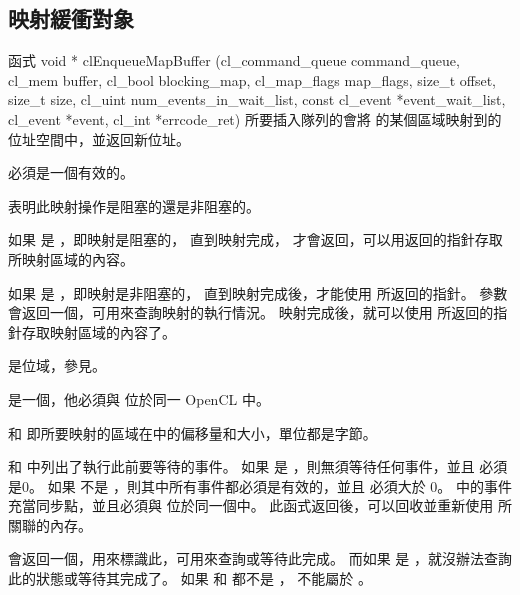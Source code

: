 \subsection{映射緩衝對象}

函式
\startCLFUNC
void * clEnqueueMapBuffer (cl_command_queue command_queue,
			cl_mem buffer,
			cl_bool blocking_map,
			cl_map_flags map_flags,
			size_t offset,
			size_t size,
			cl_uint num_events_in_wait_list,
			const cl_event *event_wait_list,
			cl_event *event,
			cl_int *errcode_ret)
\stopCLFUNC
所要插入隊列的會將  的某個區域映射到的位址空間中，並返回新位址。

 必須是一個有效的。

 表明此映射操作是{\ftRef 阻塞的}還是{\ftRef 非阻塞的}。

如果  是 ，即映射是阻塞的，
直到映射完成，  才會返回，可以用返回的指針存取所映射區域的內容。

如果  是 ，即映射是非阻塞的，
直到映射完成後，才能使用  所返回的指針。
參數  會返回一個，可用來查詢映射的執行情況。
映射完成後，就可以使用  所返回的指針存取映射區域的內容了。

 是位域，參見。

 是一個，他必須與  位於同一 OpenCL 中。

 和  即所要映射的區域在中的偏移量和大小，單位都是字節。

 和  中列出了執行此前要等待的事件。
如果  是 ，則無須等待任何事件，並且  必須是0。
如果  不是 ，則其中所有事件都必須是有效的，並且  必須大於 0。
 中的事件充當同步點，並且必須與  位於同一個中。
此函式返回後，可以回收並重新使用  所關聯的內存。

 會返回一個，用來標識此，可用來查詢或等待此完成。
而如果  是 ，就沒辦法查詢此的狀態或等待其完成了。
如果  和  都不是 ，  不能屬於 。

